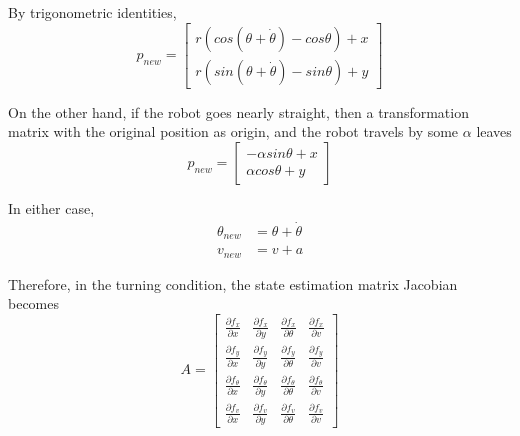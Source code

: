 \documentclass[11pt]{article}
\begin{document}
By trigonometric identities,
\begin{equation}
p_{new} = \begin{bmatrix}
r (cos(\theta + \dot{\theta}) - cos\theta) + x \\
r (sin(\theta + \dot{\theta}) - sin\theta) + y
\end{bmatrix}
\end{equation}

On the other hand, if the robot goes nearly straight, then a transformation matrix with the original position as origin, and the robot travels by some $\alpha$ leaves
\begin{equation}
p_{new} = \begin{bmatrix}
-\alpha sin\theta + x \\
\alpha cos\theta + y
\end{bmatrix}
\end{equation}

In either case,
\begin{align}
\theta_{new}  & = \theta + \dot{\theta} \\
v_{new} & = v + a
\end{align}

Therefore, in the turning condition, the state estimation matrix Jacobian becomes
\begin{equation}
A = \begin{bmatrix}
\frac{\partial f_x}{\partial x} & \frac{\partial f_x}{\partial y} & \frac{\partial f_x}{\partial \theta} & \frac{\partial f_x}{\partial v} \\
\frac{\partial f_y}{\partial x} & \frac{\partial f_y}{\partial y} & \frac{\partial f_y}{\partial \theta} & \frac{\partial f_y}{\partial v} \\
\frac{\partial f_{\theta}}{\partial x} & \frac{\partial f_{\theta}}{\partial y} & \frac{\partial f_{\theta}}{\partial \theta} & \frac{\partial f_{\theta}}{\partial v} \\
\frac{\partial f_v}{\partial x} & \frac{\partial f_v}{\partial y} & \frac{\partial f_v}{\partial \theta} & \frac{\partial f_v}{\partial v}
\end{bmatrix}
\end{equation}
\end{document}
